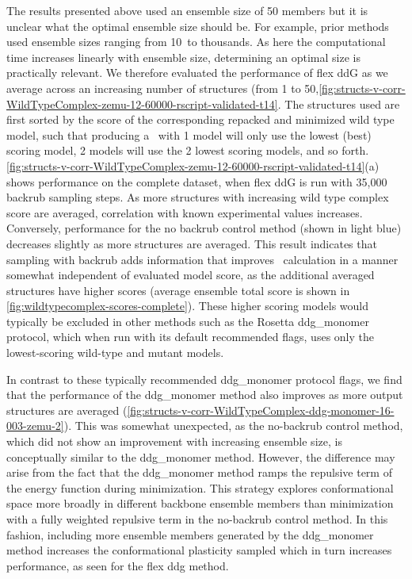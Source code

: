 The results presented above used an ensemble size of 50 members but it is unclear what the optimal ensemble size should be. For example, prior methods used ensemble sizes ranging from 10\cite{kamisetty_accounting_2011}\ to thousands\cite{benedix_predicting_2009}. As here the computational time increases linearly with ensemble size, determining an optimal size is practically relevant. We therefore evaluated the performance of flex ddG as we average across an increasing number of structures (from 1 to 50,\cref{fig:structs-v-corr-WildTypeComplex-zemu-12-60000-rscript-validated-t14}.
The structures used are first sorted by the score of the corresponding repacked and minimized wild type model, such that producing a \ddg\ with 1 model will only use the lowest (best) scoring model, 2 models will use the 2 lowest scoring models, and so forth.
\cref{fig:structs-v-corr-WildTypeComplex-zemu-12-60000-rscript-validated-t14}(a) shows performance on the complete dataset, when flex ddG is run with 35,000 backrub sampling steps.
As more structures with increasing wild type complex score are averaged, correlation with known experimental values increases.
Conversely, performance for the no backrub control method (shown in light blue) decreases slightly as more structures are averaged.
This result indicates that sampling with backrub adds information that improves \ddg\ calculation in a manner somewhat independent of evaluated model score, as the additional averaged structures have higher scores (average ensemble total score is shown in \cref{fig:wildtypecomplex-scores-complete}).
These higher scoring models would typically be excluded in other methods such as the Rosetta ddg\_monomer protocol, which when run with its default recommended flags, uses only the lowest-scoring wild-type and mutant models.

In contrast to these typically recommended ddg\_monomer protocol flags\cite{kellogg_role_2011}, we find that the performance of the ddg\_monomer method also improves as more output structures are averaged (\cref{fig:structs-v-corr-WildTypeComplex-ddg-monomer-16-003-zemu-2}).
This was somewhat unexpected, as the no-backrub control method, which did not show an improvement with increasing ensemble size, is conceptually similar to the ddg\_monomer method. However, the difference may arise from the fact that the ddg\_monomer method ramps the repulsive term of the energy function during minimization. This strategy explores conformational space more broadly in different backbone ensemble members than minimization with a fully weighted repulsive term in the no-backrub control method. In this fashion, including more ensemble members generated by the ddg\_monomer method increases the conformational plasticity sampled which in turn increases performance, as seen for the flex ddg method.

